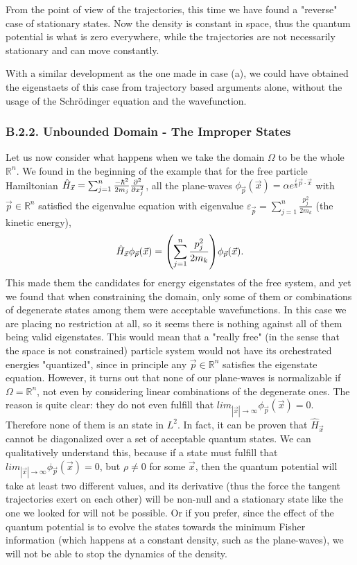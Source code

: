 \documentclass[11pt, a4paper]{article} %
\newcommand{\R}{\mathbb{R}} %
\begin{document}
From the point of view of the trajectories, this time we have found a "reverse" case of stationary states. Now the density is constant in space, thus the quantum potential is what is zero everywhere, while the trajectories are not necessarily stationary and can move constantly.

With a similar development as the one made in case (a), we could have obtained the eigenstaets of this case from trajectory based arguments alone, without the usage of the Schrödinger equation and the wavefunction.

\subsubsection*{B.2.2. Unbounded Domain - The Improper States}
Let us now consider what happens when we take the domain $\Omega$ to be the whole $\R^n$. We found in the beginning of the example that for the free particle Hamiltonian $\hat{H}_{\vec{x}}=\sum_{j=1}^n\frac{-\hbar^2}{2m_j}\pdv[2]{}{x_j}$, all the plane-waves $\phi_{\vec{p}}(\vec{x})=\alpha e^{\frac{i}{\hbar}\vec{p}\cdot\vec{x}}$ with $\vec{p}\in\R^n$ satisfied the eigenvalue equation with eigenvalue $\varepsilon_{\vec{p}}=\sum_{j=1}^n\frac{p_j^2}{2m_k}$ (the kinetic energy),
\begin{equation}
\hat{H}_{\vec{x}}\phi_{\vec{p}}(\vec{x}) = \qty(\sum_{j=1}^n\frac{p_j^2}{2m_k}) \phi_{\vec{p}}(\vec{x}).
\end{equation}
This made them the candidates for energy eigenstates of the free system, and yet we found that when constraining the domain, only some of them or combinations of degenerate states among them were acceptable wavefunctions. In this case we are placing no restriction at all, so it seems there is nothing against all of them being valid eigenstates. This would mean that a "really free" (in the sense that the space is not constrained) particle system would not have its orchestrated energies "quantized", since in principle any $\vec{p}\in\R^n$ satisfies the eigenstate equation. However, it turns out that none of our plane-waves is normalizable if $\Omega=\R^n$, not even by considering linear combinations of the degenerate ones. The reason is quite clear: they do not even fulfill that $lim_{|\vec{x}|\rightarrow \infty}\phi_{\vec{p}}(\vec{x})=0$. Therefore none of them is an state in $L^2$. In fact, it can be proven that $\hat{H}_{\vec{x}}$ cannot be diagonalized over a set of acceptable quantum states. We can qualitatively understand this, because if a state must fulfill that $lim_{|\vec{x}|\rightarrow \infty}\phi_{\vec{p}}(\vec{x})=0$, but $\rho\neq 0$ for some $\vec{x}$, then the quantum potential will take at least two different values, and its derivative (thus the force the tangent trajectories exert on each other) will be non-null and a stationary state like the one we looked for will not be possible. Or if you prefer, since the effect of the quantum potential is to evolve the states towards the minimum Fisher information (which happens at a constant density, such as the plane-waves), we will not be able to stop the dynamics of the density. 
\end{document}
